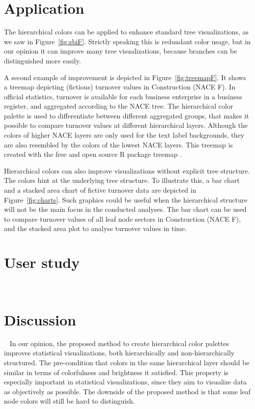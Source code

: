 \documentclass[journal]{vgtc}                %
\begin{document}
\section{Application}\label{secapplication}
The hierarchical colors can be applied to enhance standard tree visualizations, as we saw in Figure~\ref{fig:sbiF}. Strictly speaking this is redundant color usage, but in our opinion it can improve many tree visualizations, because branches can be distinguished more easily. 

A second example of improvement is depicted in Figure~\ref{fig:treemapF}. It shows a treemap depicting (fictious) turnover values in Construction (NACE F). In official statistics, turnover is available for each business enterprise in a business register, and aggregated according to the NACE tree. The hierarchical color palette is used to differentiate between different aggregated groups, that makes it possible to compare turnover values at different hierarchical layers. Although the colors of higher NACE layers are only used for the text label backgrounds, they are also resembled by the colors of the lowest NACE layers. This treemap is created with the free and open source R package treemap \cite{treemap}.

Hierarchical colors can also improve visualizations without explicit tree structure. The colors hint at the underlying tree structure.
To illustrate this, a bar chart and a stacked area chart of fictive turnover data are depicted in Figure~\ref{fig:charts}. Such graphics could be useful when the hierarchical structure will not be the main focus in the conducted analyses. The bar chart can be used to compare turnover values of all leaf node sectors in Construction (NACE F), and the stacked area plot to analyse turnover values in time.





\section{User study}~\label{secuser}


\section{Discussion}~\label{secdisc}
In our opinion, the proposed method to create hierarchical color palettes improves statistical visualizations, both hierarchically and non-hierarchically structured. The pre-condition that colors in the same hierarchical layer should be similar in terms of colorfulness and brightness it satisfied. This property is especially important in statistical visualizations, since they aim to visualize data as objectively as possible. The downside of the proposed method is that some leaf node colors will still be hard to distinguish.
\end{document}
